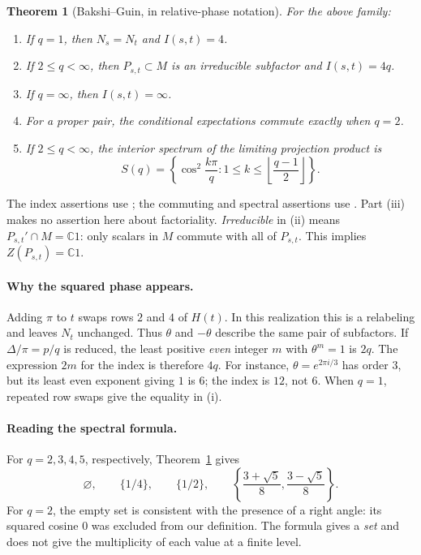 \documentclass[11pt]{article}
\newtheorem{theorem}{Theorem}[section]
\theoremstyle{definition}
\theoremstyle{remark}
\newcommand{\C}{\mathbb C}
\begin{document}
\begin{theorem}[Bakshi--Guin, in relative-phase notation]\label{thm:bg}
For the above family:
\begin{enumerate}[label=\textup{(\roman*)}]
\item If \(q=1\), then \(N_s=N_t\) and \(I(s,t)=4\).
\item If \(2\leq q<\infty\), then \(P_{s,t}\subset M\) is an
irreducible subfactor and \(I(s,t)=4q\).
\item If \(q=\infty\), then \(I(s,t)=\infty\).
\item For a proper pair, the conditional expectations commute
exactly when \(q=2\).
\item If \(2\leq q<\infty\), the interior spectrum of the limiting
projection product is
\[
 S(q)=\left\{\cos^2\frac{k\pi}{q}:
                   1\leq k\leq\left\lfloor\frac{q-1}{2}\right\rfloor\right\}.
\]
\end{enumerate}
\end{theorem}
The index assertions use \cite[Theorems 7.30, 7.32, 7.36--7.37]{BG};
the commuting and spectral assertions use
\cite[Theorems 7.46--7.47]{BG}. Part (iii) makes no assertion here
about factoriality. \emph{Irreducible} in (ii) means
\(P_{s,t}'\cap M=\C1\): only scalars in \(M\) commute with all of
\(P_{s,t}\). This implies \(Z(P_{s,t})=\C1\).

\paragraph{Why the squared phase appears.}
Adding \(\pi\) to \(t\) swaps rows \(2\) and \(4\) of \(H(t)\).
In this realization this is a relabeling and leaves \(N_t\) unchanged.
Thus \(\theta\) and \(-\theta\) describe the same pair of subfactors.
If \(\Delta/\pi=p/q\) is reduced, the least positive \emph{even}
integer \(m\) with \(\theta^m=1\) is \(2q\). The expression \(2m\)
for the index is therefore \(4q\).
For instance, \(\theta=e^{2\pi i/3}\) has order \(3\), but its
least even exponent giving \(1\) is \(6\); the index is \(12\),
not \(6\). When \(q=1\), repeated row swaps give the equality in (i).

\paragraph{Reading the spectral formula.}
For \(q=2,3,4,5\), respectively, Theorem~\ref{thm:bg} gives
\begin{equation}\label{eq:smallsets}
 \varnothing,\qquad
 \{1/4\},\qquad
 \{1/2\},\qquad
 \left\{\frac{3+\sqrt5}{8},\frac{3-\sqrt5}{8}\right\}.
\end{equation}
For \(q=2\), the empty set is consistent with the presence of a right
angle: its squared cosine \(0\) was excluded from our definition.
The formula gives a \emph{set} and does not give the multiplicity of
each value at a finite level.
\end{document}
